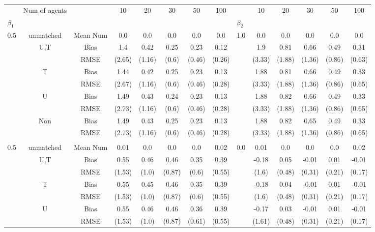 \begin{tabular}{@{\extracolsep{5pt}}lc|cccccc|lccccc}
\toprule 
 & Num of agents &  & 10 & 20 & 30 & 50 & 100 &  & 10 & 20 & 30 & 50 & 100 \\
$\beta_1$ &  &  &  &  &  &  &  & $\beta_2$ &  &  &  &  &  \\
\midrule 
0.5 & unmatched & Mean Num & 0.0 & 0.0 & 0.0 & 0.0 & 0.0 & 1.0 & 0.0 & 0.0 & 0.0 & 0.0 & 0.0 \\
 & U,T & Bias & 1.4 & 0.42 & 0.25 & 0.23 & 0.12 &  & 1.9 & 0.81 & 0.66 & 0.49 & 0.31 \\
 &  & RMSE & (2.65) & (1.16) & (0.6) & (0.46) & (0.26) &  & (3.33) & (1.88) & (1.36) & (0.86) & (0.63) \\
 & T & Bias & 1.44 & 0.42 & 0.25 & 0.23 & 0.13 &  & 1.88 & 0.81 & 0.66 & 0.49 & 0.33 \\
 &  & RMSE & (2.67) & (1.16) & (0.6) & (0.46) & (0.28) &  & (3.33) & (1.88) & (1.36) & (0.86) & (0.65) \\
 & U & Bias & 1.49 & 0.43 & 0.24 & 0.23 & 0.13 &  & 1.88 & 0.82 & 0.66 & 0.49 & 0.33 \\
 &  & RMSE & (2.73) & (1.16) & (0.6) & (0.46) & (0.28) &  & (3.33) & (1.88) & (1.36) & (0.86) & (0.65) \\
 & Non & Bias & 1.49 & 0.43 & 0.25 & 0.23 & 0.13 &  & 1.88 & 0.82 & 0.65 & 0.49 & 0.33 \\
 &  & RMSE & (2.73) & (1.16) & (0.6) & (0.46) & (0.28) &  & (3.33) & (1.88) & (1.36) & (0.86) & (0.65) \\
 &  &  &  &  &  &  &  &  &  &  &  &  &  \\
0.5 & unmatched & Mean Num & 0.01 & 0.0 & 0.0 & 0.0 & 0.02 & 0.0 & 0.01 & 0.0 & 0.0 & 0.0 & 0.02 \\
 & U,T & Bias & 0.55 & 0.46 & 0.46 & 0.35 & 0.39 &  & -0.18 & 0.05 & -0.01 & 0.01 & -0.01 \\
 &  & RMSE & (1.53) & (1.0) & (0.87) & (0.6) & (0.55) &  & (1.6) & (0.48) & (0.31) & (0.21) & (0.17) \\
 & T & Bias & 0.55 & 0.45 & 0.46 & 0.35 & 0.39 &  & -0.18 & 0.04 & -0.01 & 0.01 & -0.01 \\
 &  & RMSE & (1.53) & (1.0) & (0.87) & (0.6) & (0.55) &  & (1.6) & (0.48) & (0.31) & (0.21) & (0.17) \\
 & U & Bias & 0.55 & 0.46 & 0.46 & 0.36 & 0.39 &  & -0.17 & 0.03 & -0.01 & 0.01 & -0.01 \\
 &  & RMSE & (1.53) & (1.0) & (0.87) & (0.61) & (0.55) &  & (1.61) & (0.48) & (0.31) & (0.21) & (0.17) \\

\end{tabular}

